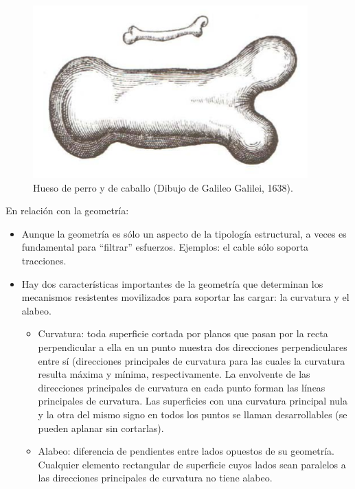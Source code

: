 \begin{figure}[h]
    \centering
    \includegraphics[width=0.75\linewidth]{Imagenes/Galileo Galilei.png}
    \caption{Hueso de perro y de caballo (Dibujo de Galileo Galilei, 1638).}
\end{figure}

En relación con la geometría:
\begin{itemize}
    \item Aunque la geometría es sólo un aspecto de la tipología estructural, a veces es fundamental para ``filtrar'' esfuerzos. Ejemplos: el cable sólo soporta tracciones.
    \item Hay dos características importantes de la geometría que determinan los mecanismos resistentes movilizados para soportar las cargar: la curvatura y el alabeo.
    \begin{itemize}
        \item Curvatura: toda superficie cortada por planos que pasan por la recta perpendicular a ella en un punto muestra dos direcciones perpendiculares entre sí (direcciones principales de curvatura para las cuales la curvatura resulta máxima y mínima, respectivamente. La envolvente de las direcciones principales de curvatura en cada punto forman las líneas principales de curvatura. Las superficies con una curvatura principal nula y la otra del mismo signo en todos los puntos se llaman desarrollables (se pueden aplanar sin cortarlas).
        \item Alabeo: diferencia de pendientes entre lados opuestos de su geometría. Cualquier elemento rectangular de superficie cuyos lados sean paralelos a las direcciones principales de curvatura no tiene alabeo.
    \end{itemize}
\end{itemize}

